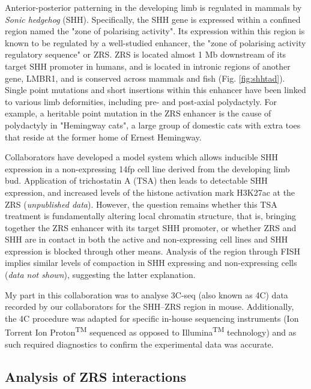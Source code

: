 \documentclass[a4paper,10pt,oneside]{book}
\begin{document}
Anterior-posterior patterning in the developing limb is regulated in mammals by \emph{Sonic hedgehog} (SHH).\cite{Anderson2012} Specifically, the SHH gene is expressed within a confined region named the "zone of polarising activity". Its expression within this region is known to be regulated by a well-studied enhancer, the "zone of polarising activity regulatory sequence" or ZRS.\cite{Hill2013a} ZRS is located almost 1 Mb downstream of its target SHH promoter in humans, and is located in intronic regions of another gene, LMBR1, and is conserved across mammals and fish (Fig. \ref{fig:shhtad}).\cite{Hill2013a, Laurell2012} Single point mutations and short insertions within this enhancer have been linked to various limb deformities, including pre- and post-axial polydactyly.\cite{Anderson2012, Lettice2008, Laurell2012} For example, a heritable point mutation in the ZRS enhancer is the cause of polydactyly in "Hemingway cats", a large group of domestic cats with extra toes that reside at the former home of Ernest Hemingway.\cite{Lettice2008}  

Collaborators have developed a model system which allows inducible SHH expression in a non-expressing 14fp cell line derived from the developing limb bud. Application of trichostatin A (TSA) then leads to detectable SHH expression, and increased levels of the histone activation mark H3K27ac at the ZRS (\emph{unpublished data}). However, the question remains whether this TSA treatment is fundamentally altering local chromatin structure, that is, bringing together the ZRS enhancer with its target SHH promoter, or whether ZRS and SHH are in contact in both the active and non-expressing cell lines and SHH expression is blocked through other means. Analysis of the region through FISH implies similar levels of compaction in SHH expressing and non-expressing cells (\emph{data not shown}), suggesting the latter explanation.

My part in this collaboration was to analyse 3C-seq (also known as 4C) data recorded by our collaborators for the SHH--ZRS region in mouse. Additionally, the 4C procedure\cite{Stadhouders2013} was adapted for specific in-house sequencing instruments (Ion Torrent Ion Proton\textsuperscript{TM} sequenced as opposed to Illumina\textsuperscript{TM} technology) and as such required diagnostics to confirm the experimental data was accurate. 


\subsection{Analysis of ZRS interactions}
\end{document}
